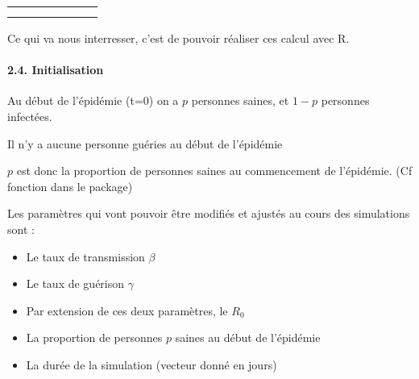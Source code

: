 \documentclass[
]{article}
\providecommand{\tightlist}{%
  \setlength{\itemsep}{0pt}\setlength{\parskip}{0pt}}
\begin{document}
\begin{longtable}[]{@{}ccccccc@{}}
\begin{minipage}[t]{0.11\columnwidth}
\strut
\end{minipage}\tabularnewline
\begin{minipage}[t]{0.05\columnwidth}\centering
3\strut
\end{minipage} & \begin{minipage}[t]{0.11\columnwidth}\centering
\strut
\end{minipage} & \begin{minipage}[t]{0.11\columnwidth}\centering
\strut
\end{minipage} & \begin{minipage}[t]{0.11\columnwidth}\centering
\strut
\end{minipage} & \begin{minipage}[t]{0.16\columnwidth}\centering
\strut
\end{minipage} & \begin{minipage}[t]{0.16\columnwidth}\centering
\strut
\end{minipage} & \begin{minipage}[t]{0.11\columnwidth}\centering
\strut
\end{minipage}\tabularnewline
\bottomrule
\end{longtable}

Ce qui va nous interresser, c'est de pouvoir réaliser ces calcul avec R.

\hypertarget{initialisation}{%
\paragraph{2.4. Initialisation}\label{initialisation}}

Au début de l'épidémie (t=0) on a \(p\) personnes saines, et \(1-p\)
personnes infectées.

Il n'y a aucune personne guéries au début de l'épidémie

\emph{\(p\)} est donc la proportion de personnes saines au commencement
de l'épidémie. (Cf fonction dans le package)

Les paramètres qui vont pouvoir être modifiés et ajustés au cours des
simulations sont :

\begin{itemize}
\tightlist
\item
  Le taux de transmission \(\beta\)
\item
  Le taux de guérison \(\gamma\)
\item
  Par extension de ces deux paramètres, le \(R_0\)
\item
  La proportion de personnes \(p\) saines au début de l'épidémie
\item
  La durée de la simulation (vecteur donné en jours)
\end{itemize}
\end{document}

